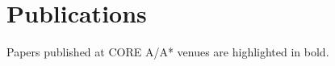\documentclass[a4paper,11pt,oneside]{article}
\begin{document}
    \clearpage
    \nocite{*}
    \renewcommand{\refname}{}
    \section*{Publications}
    Papers published at CORE A/A* venues are highlighted in bold.
    \titleformat{\section}{}{}{}{}
    \vspace{-3em}
    
    
\end{document}
